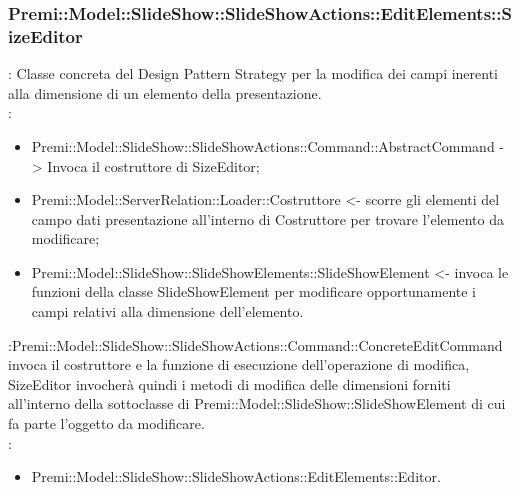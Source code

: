 {    \subsubsection{Premi::Model::SlideShow::SlideShowActions::EditElements::SizeEditor}{
				\textbf{\tipo}: Classe concreta del Design Pattern Strategy per la modifica dei campi inerenti alla dimensione di un elemento della presentazione.\\	
				\textbf{\relaz}: 
				\begin{itemize}
					\item Premi::Model::SlideShow::SlideShowActions::Command::AbstractCommand -> Invoca il costruttore di SizeEditor;
                    \item Premi::Model::ServerRelation::Loader::Costruttore <- scorre gli elementi del campo dati presentazione all'interno di Costruttore per trovare l'elemento da modificare; 
                    \item Premi::Model::SlideShow::SlideShowElements::SlideShowElement <- invoca le funzioni della classe SlideShowElement per modificare opportunamente i campi relativi alla dimensione dell’elemento.
				\end{itemize}	\textbf{\interfacce}:Premi::Model::SlideShow::SlideShowActions::Command::ConcreteEditCommand invoca il costruttore e la funzione di esecuzione dell’operazione di modifica, SizeEditor invocherà quindi i metodi di modifica delle dimensioni forniti all’interno della sottoclasse di Premi::Model::SlideShow::SlideShowElement di cui fa parte l’oggetto da modificare.\\
                \textbf{\base}: 
                    \begin{itemize}
                    \item Premi::Model::SlideShow::SlideShowActions::EditElements::Editor.
                    \end{itemize}
                    }
}

